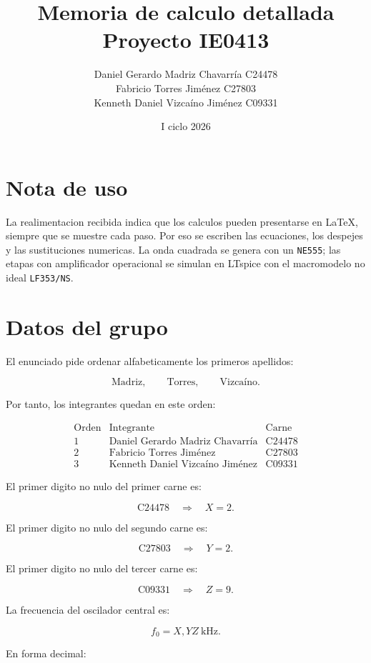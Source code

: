 \documentclass[11pt,letterpaper]{article}
\title{Memoria de calculo detallada\\Proyecto IE0413}
\author{Daniel Gerardo Madriz Chavarr\'ia C24478\\
Fabricio Torres Jim\'enez C27803\\
Kenneth Daniel Vizca\'ino Jim\'enez C09331}
\date{I ciclo 2026}
\begin{document}
\maketitle

\section*{Nota de uso}

La realimentacion recibida indica que los calculos pueden presentarse en
\LaTeX, siempre que se muestre cada paso. Por eso se escriben las ecuaciones,
los despejes y las sustituciones numericas. La onda cuadrada se genera con un
\texttt{NE555}; las etapas con amplificador operacional se simulan en LTspice
con el macromodelo no ideal \texttt{LF353/NS}.

\section{Datos del grupo}

El enunciado pide ordenar alfabeticamente los primeros apellidos:

\[
\text{Madriz}, \qquad \text{Torres}, \qquad \text{Vizca\'ino}.
\]

Por tanto, los integrantes quedan en este orden:

\[
\begin{array}{c|c|c}
\text{Orden} & \text{Integrante} & \text{Carne} \\
\hline
1 & \text{Daniel Gerardo Madriz Chavarr\'ia} & \text{C24478} \\
2 & \text{Fabricio Torres Jim\'enez} & \text{C27803} \\
3 & \text{Kenneth Daniel Vizca\'ino Jim\'enez} & \text{C09331}
\end{array}
\]

El primer digito no nulo del primer carne es:

\[
\text{C24478}\quad \Rightarrow \quad X=2.
\]

El primer digito no nulo del segundo carne es:

\[
\text{C27803}\quad \Rightarrow \quad Y=2.
\]

El primer digito no nulo del tercer carne es:

\[
\text{C09331}\quad \Rightarrow \quad Z=9.
\]

La frecuencia del oscilador central es:

\[
f_0=X,YZ~\text{kHz}.
\]

En forma decimal:
\end{document}
